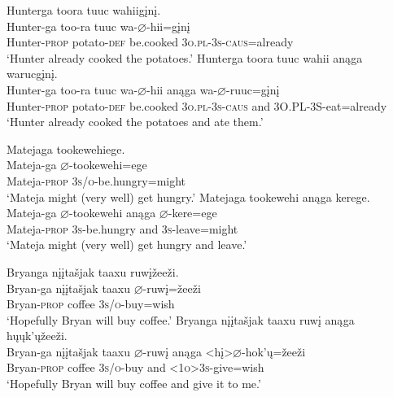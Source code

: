 \documentclass[output=paper]{LSP/langsci}
\begin{document}
\begin{exe}
\ex
\begin{xlist} 
\ex 
\glll Hunterga 	toora 	tuuc 	wahiig\k{i}n\k{i}. \\
Hunter-ga 	too-ra 	tuuc 	wa-$\varnothing$-hii=g\k{i}n\k{i} \\
	Hunter-\textsc{prop} potato-\textsc{def} 	be.cooked 	\textsc{3o.pl-3s-caus}=already \\
\trans `Hunter already cooked the potatoes.'
\ex 
\glll Hunterga  	toora 		tuuc 		wahii 	anąga 	warucg\k{i}n\k{i}. \\
Hunter-ga  too-ra	tuuc 	wa-$\varnothing$-hii 	 anąga wa-$\varnothing$-ruuc=g\k{i}n\k{i} \\
Hunter-\textsc{prop} potato-\textsc{def} 	be.cooked	 \textsc{3o.pl-3s-caus} and 3O.PL-3S-eat=already\\
`Hunter already cooked the potatoes and ate them.'
\end{xlist}
\ex
\begin{xlist}
\ex	
\glll Matejaga 	tookewehiege. \\
Mateja-ga 	$\varnothing$-tookewehi=ege \\
	Mateja-\textsc{prop} 	\textsc{3s/o}-be.hungry=might \\
\trans `Mateja might (very well) get hungry.'
\ex 
\glll Matejaga 			tookewehi 		anąga 	kerege. \\
Mateja-ga 			$\varnothing$-tookewehi 	anąga 	$\varnothing$-kere=ege  \\
Mateja-\textsc{prop} 	\textsc{3s}-be.hungry and 			\textsc{3s}-leave=might \\
\trans `Mateja might (very well) get hungry and leave.'
\end{xlist}

\ex	
\begin{xlist}
\ex 
\glll Bryanga 			{n\k{i}\k{i}ta\v{s}jak taaxu }	ruw\k{i}\v{z}ee\v{z}i. \\
Bryan-ga 		{n\k{i}\k{i}ta\v{s}jak 	taaxu }	$\varnothing$-ruw\k{i}=\v{z}ee\v{z}i \\
	Bryan-\textsc{prop} 	coffee	\textsc{3s/o}-buy=wish \\
\trans `Hopefully Bryan will buy coffee.'
\ex 
\glll Bryanga 	{n\k{i}\k{i}ta\v{s}jak taaxu }	ruw\k{i} 		anąga 	h\k{u}\k{u}k'\k{u}\v{z}ee\v{z}i. \\
Bryan-ga 	{n\k{i}\k{i}ta\v{s}jak taaxu }	$\varnothing$-ruw\k{i}  	anąga 	<h\k{i}>$\varnothing$-hok'\k{u}=\v{z}ee\v{z}i \\
	Bryan-\textsc{prop} 	coffee 		\textsc{3s/o}-buy		 and 		\textsc{<1o>3s}-give=wish \\
\trans `Hopefully Bryan will buy coffee and give it to me.'
\end{xlist}
\end{exe}	
	
\end{document}
